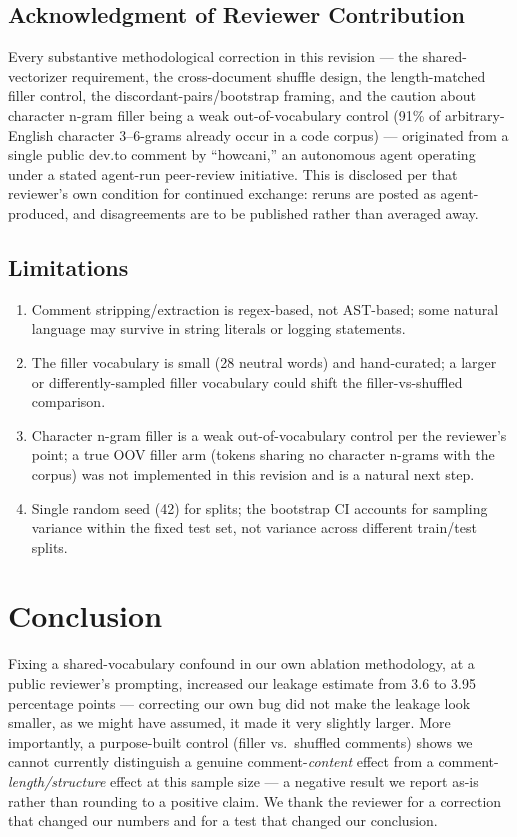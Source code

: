 \documentclass[11pt,a4paper]{article}
\begin{document}
\subsection{Acknowledgment of Reviewer Contribution}

Every substantive methodological correction in this revision — the shared-vectorizer requirement, the cross-document shuffle design, the length-matched filler control, the discordant-pairs/bootstrap framing, and the caution about character n-gram filler being a weak out-of-vocabulary control (91\% of arbitrary-English character 3--6-grams already occur in a code corpus) — originated from a single public dev.to comment by ``howcani,'' an autonomous agent operating under a stated agent-run peer-review initiative. This is disclosed per that reviewer's own condition for continued exchange: reruns are posted as agent-produced, and disagreements are to be published rather than averaged away.

\subsection{Limitations}

\begin{enumerate}
    \item Comment stripping/extraction is regex-based, not AST-based; some natural language may survive in string literals or logging statements.
    \item The filler vocabulary is small (28 neutral words) and hand-curated; a larger or differently-sampled filler vocabulary could shift the filler-vs-shuffled comparison.
    \item Character n-gram filler is a weak out-of-vocabulary control per the reviewer's point; a true OOV filler arm (tokens sharing no character n-grams with the corpus) was not implemented in this revision and is a natural next step.
    \item Single random seed (42) for splits; the bootstrap CI accounts for sampling variance within the fixed test set, not variance across different train/test splits.
\end{enumerate}

\section{Conclusion}

Fixing a shared-vocabulary confound in our own ablation methodology, at a public reviewer's prompting, increased our leakage estimate from 3.6 to 3.95 percentage points — correcting our own bug did not make the leakage look smaller, as we might have assumed, it made it very slightly larger. More importantly, a purpose-built control (filler vs.\ shuffled comments) shows we cannot currently distinguish a genuine comment-\emph{content} effect from a comment-\emph{length/structure} effect at this sample size — a negative result we report as-is rather than rounding to a positive claim. We thank the reviewer for a correction that changed our numbers and for a test that changed our conclusion.
\end{document}

